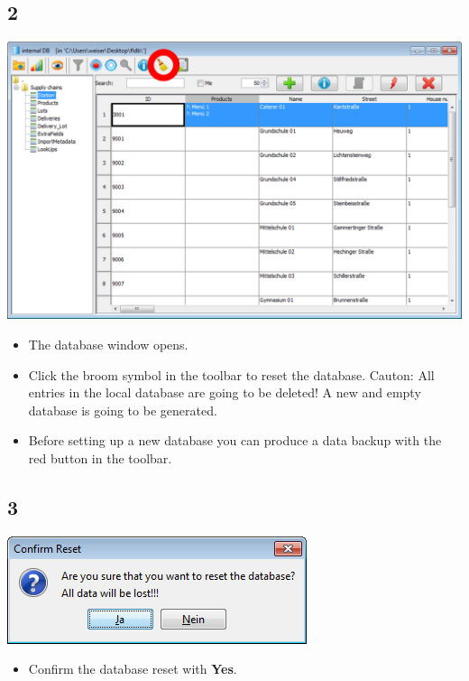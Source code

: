 \documentclass{beamer}
\begin{document}
\subsection{2}
\begin{frame}
	\begin{center}
  		\includegraphics[height=0.6\textheight]{2.png}
	\end{center}
	\begin{itemize}
		\item The database window opens.
		\item Click the broom symbol in the toolbar to reset the database. Cauton: All entries in the local database are going to be deleted! A new and empty database is going to be generated.
		\item Before setting up a new database you can produce a data backup with the red button in the toolbar.
	\end{itemize}
\end{frame}

\subsection{3}
\begin{frame}
	\begin{center}
  		\includegraphics[height=0.3\textheight]{3.png}
	\end{center}
	\begin{itemize}
		\item Confirm the database reset with \textbf{Yes}.
	\end{itemize}
\end{frame}
\end{document}
